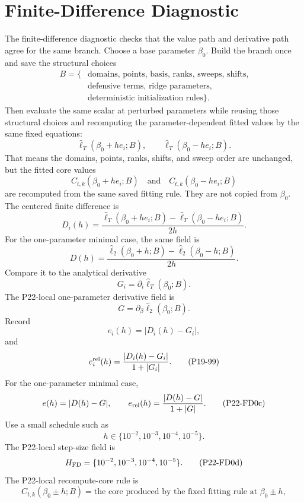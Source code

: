 \documentclass[11pt]{article}
\newcommand{\widehatell}{\widehat\ell}
\begin{document}
\section{Finite-Difference Diagnostic}

The finite-difference diagnostic checks that the value path and derivative path agree
for the same branch.  Choose a base parameter \(\beta_0\).  Build the branch
once and save the structural choices
\[
    \begin{aligned}
    B=\{&
    \text{domains, points, basis, ranks, sweeps, shifts,}\\
    &\text{defensive terms, ridge parameters,}\\
    &\text{deterministic initialization rules}\}.
    \end{aligned}
    \tag{P19-94}
\]
Then evaluate the same scalar at perturbed parameters while reusing those
structural choices and recomputing the parameter-dependent fitted values by the
same fixed equations:
\[
    \widehatell_T(\beta_0+h e_i;B),
    \qquad
    \widehatell_T(\beta_0-h e_i;B).
    \tag{P19-95}
\]
That means the domains, points, ranks, shifts, and sweep order are unchanged,
but the fitted core values
\[
    C_{t,k}(\beta_0+h e_i;B)
    \quad\text{and}\quad
    C_{t,k}(\beta_0-h e_i;B)
    \tag{P19-95a}
\]
are recomputed from the same saved fitting rule.  They are not copied from
\(\beta_0\).
The centered finite difference is
\[
    D_i(h)
    =
    \frac{
    \widehatell_T(\beta_0+h e_i;B)
    -
    \widehatell_T(\beta_0-h e_i;B)}
    {2h}.
    \tag{P19-96}
\]
For the one-parameter minimal case, the same field is
\[
    D(h)
    =
    \frac{
    \widehatell_2(\beta_0+h;B)
    -
    \widehatell_2(\beta_0-h;B)}
    {2h}.
    \tag{P22-FD0a}
\]
Compare it to the analytical derivative
\[
    G_i=\partial_i\widehatell_T(\beta_0;B).
    \tag{P19-97}
\]
The P22-local one-parameter derivative field is
\[
    G=\partial_\beta\widehatell_2(\beta_0;B).
    \tag{P22-FD0b}
\]
Record
\[
    e_i(h)=|D_i(h)-G_i|,
    \tag{P19-98}
\]
and
\[
    e_i^{\rm rel}(h)
    =
    \frac{|D_i(h)-G_i|}{1+|G_i|}.
    \tag{P19-99}
\]
For the one-parameter minimal case,
\[
    e(h)=|D(h)-G|,
    \qquad
    e_{\rm rel}(h)=\frac{|D(h)-G|}{1+|G|}.
    \tag{P22-FD0c}
\]
Use a small schedule such as
\[
    h\in\{10^{-2},10^{-3},10^{-4},10^{-5}\}.
    \tag{P19-100}
\]
The P22-local step-size field is
\[
    H_{\rm FD}=\{10^{-2},10^{-3},10^{-4},10^{-5}\}.
    \tag{P22-FD0d}
\]
The P22-local recompute-core rule is
\[
    C_{t,k}(\beta_0\pm h;B)
    =
    \text{the core produced by the fixed fitting rule at }\beta_0\pm h,
    \tag{P22-FD0e}
\]
\end{document}
